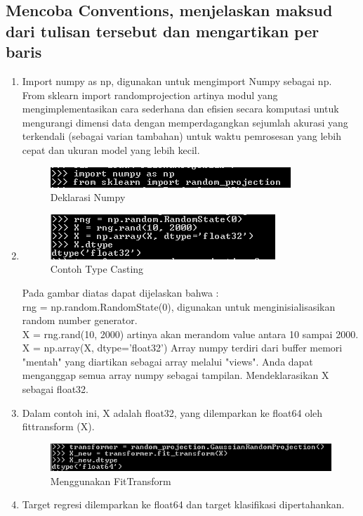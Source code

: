 \subsection{Mencoba Conventions, menjelaskan maksud dari tulisan tersebut dan mengartikan per baris}
\begin{enumerate}
\item
Import numpy as np, digunakan untuk mengimport Numpy sebagai np.\\
From sklearn import randomprojection artinya modul yang mengimplementasikan cara sederhana dan efisien secara komputasi untuk mengurangi dimensi data dengan memperdagangkan sejumlah akurasi yang terkendali (sebagai varian tambahan) untuk waktu pemrosesan yang lebih cepat dan ukuran model yang lebih kecil.
\begin{figure}
	\begin{center}
   	 \includegraphics[scale=1]{figures/tasya12.png}
   	 \caption{Deklarasi Numpy}	
	\end{center}
\end{figure}
\item
\begin{figure}
	\begin{center}
   	 \includegraphics[scale=1]{figures/tasya13.png}
   	 \caption{Contoh Type Casting}	
	\end{center}
\end{figure}
Pada gambar diatas dapat dijelaskan bahwa :\\
rng = np.random.RandomState(0), digunakan untuk menginisialisasikan random number generator.\\
X = rng.rand(10, 2000) artinya akan merandom value antara 10 sampai 2000.\\
X = np.array(X, dtype='float32') Array numpy terdiri dari buffer memori "mentah" yang diartikan sebagai array melalui "views". Anda dapat menganggap semua array numpy sebagai tampilan. Mendeklarasikan X sebagai float32.
\item
Dalam contoh ini, X adalah float32, yang dilemparkan ke float64 oleh fittransform (X).
\begin{figure}
	\begin{center}
   	 \includegraphics[scale=1]{figures/tasya14.png}
   	 \caption{Menggunakan FitTransform}
	\end{center}
\end{figure}
\item
Target regresi dilemparkan ke float64 dan target klasifikasi dipertahankan.


\end{enumerate}
